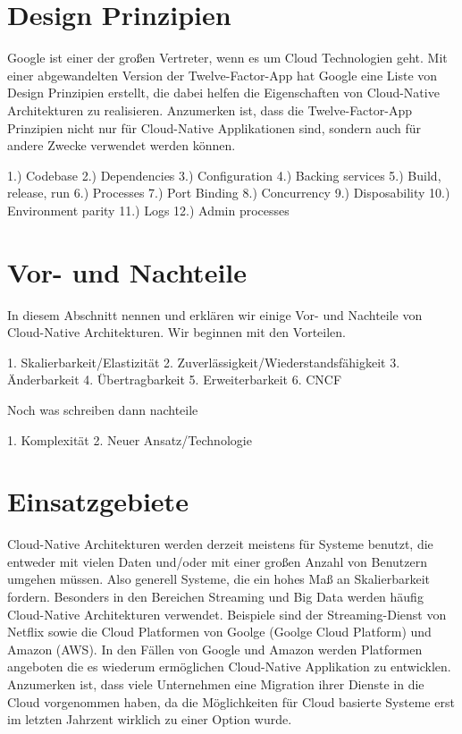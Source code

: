 \section{Design Prinzipien}
Google ist einer der großen Vertreter, wenn es um Cloud Technologien geht. Mit einer abgewandelten Version der Twelve-Factor-App hat Google eine Liste von Design Prinzipien erstellt, die dabei helfen die Eigenschaften von Cloud-Native Architekturen zu realisieren. Anzumerken ist, dass die Twelve-Factor-App Prinzipien nicht nur für Cloud-Native Applikationen sind, sondern auch für andere Zwecke verwendet werden können.

1.) Codebase
2.) Dependencies
3.) Configuration
4.) Backing services
5.) Build, release, run
6.) Processes
7.) Port Binding
8.) Concurrency
9.) Disposability
10.) Environment parity
11.) Logs
12.) Admin processes

\section{Vor- und Nachteile}
In diesem Abschnitt nennen und erklären wir einige Vor- und Nachteile von Cloud-Native Architekturen. Wir beginnen mit den Vorteilen.

1. Skalierbarkeit/Elastizität
2. Zuverlässigkeit/Wiederstandsfähigkeit
3. Änderbarkeit
4. Übertragbarkeit
5. Erweiterbarkeit
6. CNCF

Noch was schreiben dann nachteile

1. Komplexität
2. Neuer Ansatz/Technologie


\section{Einsatzgebiete}
Cloud-Native Architekturen werden derzeit meistens für Systeme benutzt, die entweder mit vielen Daten und/oder mit einer großen Anzahl von Benutzern umgehen müssen. Also generell Systeme, die ein hohes Maß an Skalierbarkeit fordern. Besonders in den Bereichen Streaming und Big Data werden häufig Cloud-Native Architekturen verwendet. 
Beispiele sind der Streaming-Dienst von Netflix sowie die Cloud Platformen von Goolge (Goolge Cloud Platform) und Amazon (AWS). In den Fällen von Google und Amazon werden Platformen angeboten die es wiederum ermöglichen Cloud-Native Applikation zu entwicklen.
Anzumerken ist, dass viele Unternehmen eine Migration ihrer Dienste in die Cloud vorgenommen haben, da die Möglichkeiten für Cloud basierte Systeme erst im letzten Jahrzent wirklich zu einer Option wurde. 